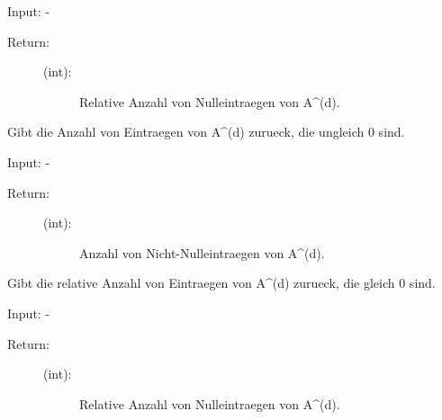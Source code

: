 \documentclass[a4paper,10pt,ngerman, openright]{sphinxmanual}
\begin{document}
\begin{fulllineitems}
\begin{fulllineitems}
Input: -
\begin{description}
\item[{Return:}] \leavevmode\begin{description}
\item[{(int):}] \leavevmode
Relative Anzahl von Nulleintraegen von A\textasciicircum{}(d).

\end{description}

\end{description}

\end{fulllineitems}


\begin{fulllineitems}
\label{\detokenize{index:sparse.Sparse.anz_nn_abs}}
Gibt die Anzahl von Eintraegen von A\textasciicircum{}(d) zurueck, die ungleich 0 sind.

Input: -
\begin{description}
\item[{Return:}] \leavevmode\begin{description}
\item[{(int):}] \leavevmode
Anzahl von Nicht-Nulleintraegen von A\textasciicircum{}(d).

\end{description}

\end{description}

\end{fulllineitems}


\begin{fulllineitems}
\label{\detokenize{index:sparse.Sparse.anz_nn_rel}}
Gibt die relative Anzahl von Eintraegen von A\textasciicircum{}(d) zurueck, die gleich 0 sind.

Input: -
\begin{description}
\item[{Return:}] \leavevmode\begin{description}
\item[{(int):}] \leavevmode
Relative Anzahl von Nulleintraegen von A\textasciicircum{}(d).

\end{description}


\end{description}
\end{fulllineitems}
\end{fulllineitems}
\end{document}

